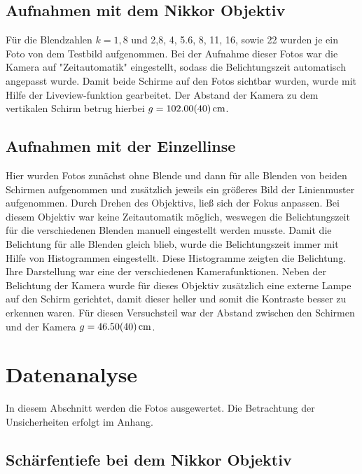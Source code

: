	\subsection{Aufnahmen mit dem Nikkor Objektiv}
		
		Für die Blendzahlen $k=1,8$ und 2,8, 4, 5.6, 8, 11, 16, sowie 22 wurden je ein Foto von dem Testbild aufgenommen.
		Bei der Aufnahme dieser Fotos war die Kamera auf "Zeitautomatik" eingestellt, sodass die Belichtungszeit automatisch angepasst wurde.
		Damit beide Schirme auf den Fotos sichtbar wurden, wurde mit Hilfe der Liveview-funktion gearbeitet.
		Der Abstand der Kamera zu dem vertikalen Schirm betrug hierbei $g = \SI{102+-0,40}{\centi\meter}$.
		
	\subsection{Aufnahmen mit der Einzellinse}
	
		Hier wurden Fotos zunächst ohne Blende und dann für alle Blenden von beiden Schirmen aufgenommen und zusätzlich jeweils ein größeres Bild der Linienmuster aufgenommen.
		Durch Drehen des Objektivs, ließ sich der Fokus anpassen.
		Bei diesem Objektiv war keine Zeitautomatik möglich, weswegen die Belichtungszeit für die verschiedenen Blenden manuell eingestellt werden musste.
		Damit die Belichtung für alle Blenden gleich blieb, wurde die Belichtungszeit immer mit Hilfe von Histogrammen eingestellt.
		Diese Histogramme zeigten die Belichtung.
		Ihre Darstellung war eine der verschiedenen Kamerafunktionen.
		Neben der Belichtung der Kamera wurde für dieses Objektiv zusätzlich eine externe Lampe auf den Schirm gerichtet, damit dieser heller und somit die Kontraste besser zu erkennen waren. 
		Für diesen Versuchsteil war der Abstand zwischen den Schirmen und der Kamera $g = \SI{46,5+-0,40}{\centi\meter}$.
		
\section{Datenanalyse} \label{sec:Analyse}
	
	In diesem Abschnitt werden die Fotos ausgewertet.
	Die Betrachtung der Unsicherheiten erfolgt im Anhang.
	
	\subsection{Schärfentiefe bei dem Nikkor Objektiv}
		
